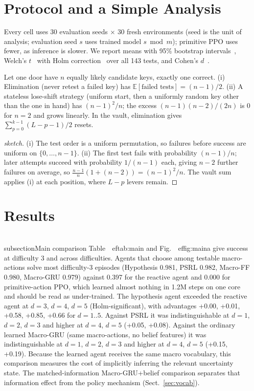 \documentclass[runningheads]{llncs}
\begin{document}
\section{Protocol and a Simple Analysis}
Every cell uses 30 evaluation seeds $\times$ 30 fresh environments (seed is the unit of analysis; evaluation seed $s$ uses trained model $s \bmod m$); primitive PPO uses fewer, as inference is slower. We report means with 95\% bootstrap intervals~\cite{efron1993}, Welch's $t$~\cite{welch1947} with Holm correction~\cite{holm1979} over all 143 tests, and Cohen's $d$~\cite{cohen1988}.

\begin{proposition}
Let one door have $n$ equally likely candidate keys, exactly one correct. (i) Elimination (never retest a failed key) has $\mathbb{E}[\text{failed tests}]=(n-1)/2$. (ii) A stateless lose-shift strategy (uniform start, then a uniformly random key other than the one in hand) has $(n-1)^2/n$; the excess $(n-1)(n-2)/(2n)$ is $0$ for $n=2$ and grows linearly. In the vault, elimination gives $\sum_{p=0}^{k-1}(L-p-1)/2$ resets.
\end{proposition}
\begin{proof}[sketch]
(i) The test order is a uniform permutation, so failures before success are uniform on $\{0,\dots,n-1\}$. (ii) The first test fails with probability $(n-1)/n$; later attempts succeed with probability $1/(n-1)$ each, giving $n-2$ further failures on average, so $\frac{n-1}{n}(1+(n-2))=(n-1)^2/n$. The vault sum applies (i) at each position, where $L-p$ levers remain.
\end{proof}

\section{Results}
\\subsection{Main comparison}
Table~\
ef{tab:main} and Fig.~\
ef{fig:main}a give success at difficulty 3 and across difficulties. Agents that choose among testable macro-actions solve most difficulty-3 episodes (Hypothesis 0.981, PSRL 0.982, Macro-FF 0.980, Macro-GRU 0.979) against 0.397 for the reactive agent and 0.000 for primitive-action PPO, which learned almost nothing in 1.2M steps on one core and should be read as under-trained. The hypothesis agent exceeded the reactive agent at $d=3$, $d=4$, $d=5$ (Holm-significant), with advantages +0.00, +0.01, +0.58, +0.85, +0.66 for $d=1..5$. Against PSRL it was indistinguishable at $d=1$, $d=2$, $d=3$ and higher at $d=4$, $d=5$ (+0.05, +0.08). Against the ordinary learned Macro-GRU (same macro-actions, no belief features) it was indistinguishable at $d=1$, $d=2$, $d=3$ and higher at $d=4$, $d=5$ (+0.15, +0.19). Because the learned agent receives the same macro vocabulary, this comparison measures the cost of implicitly inferring the relevant uncertainty state. The matched-information Macro-GRU+belief comparison separates that information effect from the policy mechanism (Sect.~\ref{sec:vocab}).
\end{document}
